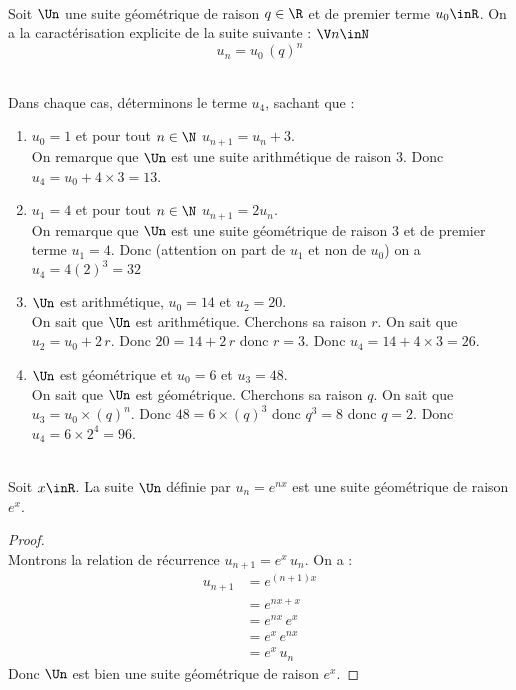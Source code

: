\documentclass[12pt,fleqn]{report} %
\begin{document}
\begin{proposition}\text{ }\\
	Soit $\Un$ une suite géométrique de raison $q\in\R$ et de premier terme $u_0 \inR$. On a la caractérisation explicite de la suite suivante : $\V n \inN$
	\[
	u_n = u_0 \, \left(q\right)^n
	\]
\end{proposition}

\begin{example}\label{Exemple Calcul Terme avec suite arithmétique et Géométrique}\text{ }\\
	Dans chaque cas, déterminons le terme $u_{4}$, sachant que : 
	\begin{enumerate}
		\item $u_0 = 1$ et pour tout $n\in \N$ $u_{n+1} = u_n + 3$.\\ On remarque que $\Un$ est une suite arithmétique de raison $3$. Donc $u_4 = u_0 + 4 \times 3 = 13$.
		\item $u_1 = 4$ et pour tout $n\in \N$ $u_{n+1} = 2 u_n$.\\ On remarque que $\Un$ est une suite géométrique de raison $3$ et de premier terme $u_1 = 4$. Donc (attention on part de $u_1$ et non de $u_0$) on a $u_4 = 4 \left(2\right)^3 = 32$
		\item $\Un$ est arithmétique, $u_0 = 14$ et $u_2 = 20$. \\On sait que $\Un$ est arithmétique. Cherchons sa raison $r$. On sait que $u_2 = u_0 + 2\,r$. Donc $20 = 14 + 2\,r$ donc $r = 3$. Donc $u_4 = 14 + 4\times 3 = 26$.
		\item $\Un$ est géométrique et $u_0 = 6$ et $u_3 = 48$. \\ On sait que $\Un$ est géométrique. Cherchons sa raison $q$. On sait que $u_3 = u_0 \times (q)^n$. Donc $48 = 6 \times (q)^3$ donc $q^3 = 8$ donc $q = 2$. Donc $u_4 = 6\times 2^4 = 96$.
	\end{enumerate}
\end{example}

\begin{proposition}\text{ }\\
	Soit $x\inR$. La suite $\Un$ définie par $u_n = e^{nx}$ est une suite géométrique de raison $e^x$.
\end{proposition}
\begin{proof}\text{ }\\
	Montrons la relation de récurrence $u_{n+1} = e^x \, u_n$. On a  : 
	\begin{align*}
	u_{n+1} & = e^{(n+1)x} \\
	& = e^{nx + x} \\
	& = e^{nx} \, e^x \\
	& = e^x \, e^{nx} \\ 
	& = e^x \, u_n
	\end{align*}
	Donc $\Un$ est bien une suite géométrique de raison $e^x$.
\end{proof}
\end{document}
